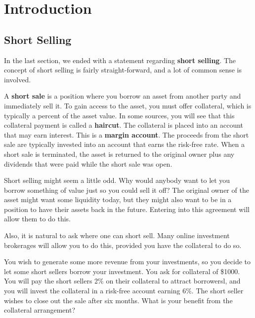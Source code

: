 \documentclass{ximera}
\begin{document}
\chapter{Introduction}

\section{Short Selling}

In the last section, we ended with a statement regarding {\bf short selling}. The concept of short selling is fairly straight-forward, and a lot of common sense is involved. 

\begin{definition}\label{def{40}}
A {\bf short sale} is a position where you borrow an asset from another party and immediately sell it. To gain access to the asset, you must offer collateral, which is typically a percent of the asset value. In some sources, you will see that this collateral payment is called a {\bf haircut}. The collateral is placed into an account that may earn interest. This is a {\bf margin account}. The proceeds from the short sale are typically invested into an account that earns the risk-free rate. When a short sale is terminated, the asset is returned to the original owner plus any dividends that were paid while the short sale was open. 
\end{definition}

\begin{remark}
Short selling might seem a little odd. Why would anybody want to let you borrow something of value just so you could sell it off? The original owner of the asset might want some liquidity today, but they might also want to be in a position to have their assets back in the future. Entering into this agreement will allow them to do this.

Also, it is natural to ask where one can short sell. Many online investment brokerages will allow you to do this, provided you have the collateral to do so.
\end{remark}

\begin{example}
You wish to generate some more revenue from your investments, so you decide to let some short sellers borrow your investment. You ask for collateral of \$1000. You will pay the short sellers 2\% on their collateral to attract borrowersl, and you will invest the collateral in a risk-free account earning 6\%. The short seller wishes to close out the sale after six months. What is your benefit from the collateral arrangement?
\end{example}
\end{document}
